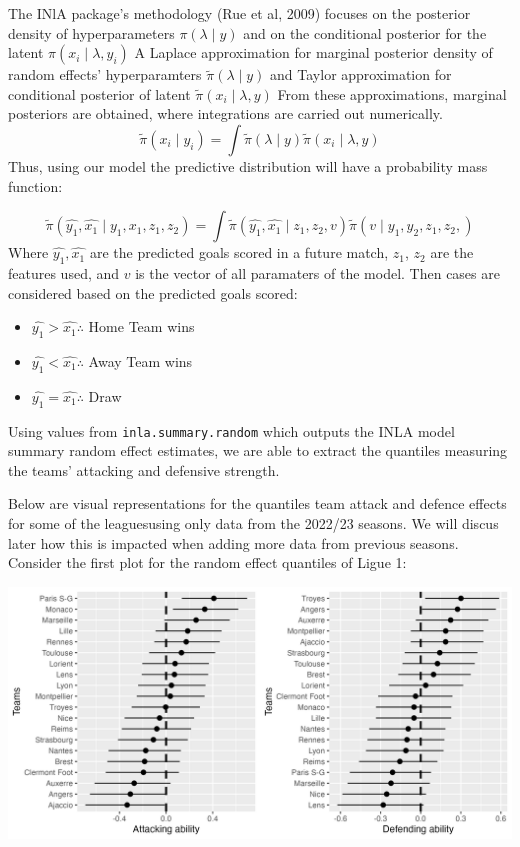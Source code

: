 \documentclass[
]{article}
\providecommand{\tightlist}{%
  \setlength{\itemsep}{0pt}\setlength{\parskip}{0pt}}
\begin{document}
The INlA package's methodology (Rue et al, 2009) focuses on the
posterior density of hyperparameters \(\pi( \lambda \mid y)\) and on the
conditional posterior for the latent \(\pi(x_i \mid \lambda , y_i)\) A
Laplace approximation for marginal posterior density of random effects'
hyperparamters \(\tilde{\pi}(\lambda \mid y)\) and Taylor approximation
for conditional posterior of latent
\(\tilde{\pi}(x_i \mid \lambda , y)\) From these approximations,
marginal posteriors are obtained, where integrations are carried out
numerically.
\[\tilde{\pi}(x_i \mid y_i) = \int \tilde{\pi}(\lambda \mid y)  \tilde{\pi}(x_i \mid \lambda , y)\]
Thus, using our model the predictive distribution will have a
probability mass function:

\[\tilde{\pi}(\hat{y_1} ,\hat{x_1} \mid y_1 , x_1, z_1, z_2) = \int \tilde{\pi}(\hat{y_1} ,\hat{x_1} \mid z_1 ,z_2,v)  \tilde{\pi}(v \mid y_1 , y_2,  z_1 ,z_2,)\]
Where \(\hat{y_1} ,\hat{x_1}\) are the predicted goals scored in a
future match, \(z_1\), \(z_2\) are the features used, and \(v\) is the
vector of all paramaters of the model. Then cases are considered based
on the predicted goals scored:

\begin{itemize}
\tightlist
\item
  \(\hat{y_1} > \hat{x_1} \therefore\) Home Team wins
\item
  \(\hat{y_1} < \hat{x_1} \therefore\) Away Team wins
\item
  \(\hat{y_1} = \hat{x_1} \therefore\) Draw
\end{itemize}

\pagebreak

Using values from \texttt{inla.summary.random} which outputs the INLA
model summary random effect estimates, we are able to extract the
quantiles measuring the teams' attacking and defensive strength.

Below are visual representations for the quantiles team attack and
defence effects for some of the leaguesusing only data from the 2022/23
seasons. We will discus later how this is impacted when adding more data
from previous seasons. Consider the first plot for the random effect
quantiles of Ligue 1:

\begin{center}\includegraphics[width=0.7\linewidth]{l1attdef} \end{center}
\end{document}
